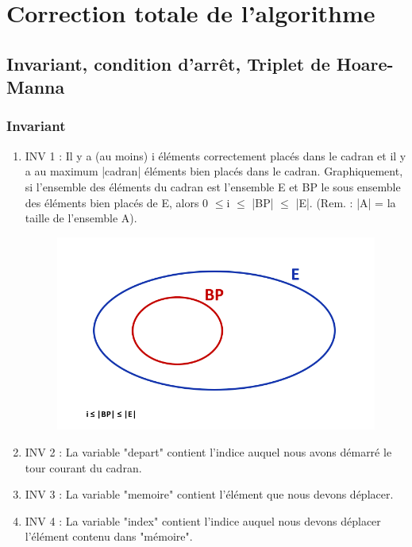 \documentclass[a4paper, 12pt]{report}
\begin{document}
\section{Correction totale de l'algorithme}
\subsection{Invariant, condition d'arrêt, Triplet de Hoare-Manna}
\subsubsection*{Invariant}

\vspace{0.2cm}

\begin{enumerate}
\item INV 1 : Il y a (au moins) i éléments correctement placés dans le cadran et il y a au maximum |cadran| éléments bien placés dans le cadran.
Graphiquement, si l'ensemble des éléments du cadran est l'ensemble E et BP le sous ensemble des éléments bien placés de E, alors 0 $\le$i $\le$ |BP| $\le$ |E|. (Rem. : |A| = la taille de l'ensemble A).\\

\begin{figure}[h]
   \includegraphics[scale=0.4]{Ensembles}
\end{figure}


\item INV 2 : La variable "depart" contient l'indice auquel nous avons démarré le tour courant du cadran.

\item INV 3 : La variable "memoire" contient l'élément que nous devons déplacer.

\item INV 4 : La variable "index" contient l'indice auquel nous devons déplacer l'élément contenu dans "mémoire".
\end{enumerate}
\end{document}
